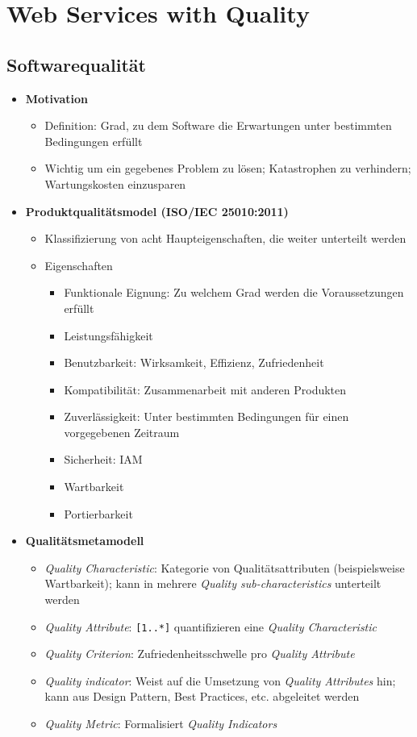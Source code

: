 \section{Web Services with Quality}

\subsection{Softwarequalität}
\begin{itemize}
	\item \textbf{Motivation}
	\begin{itemize}
		\item Definition: Grad, zu dem Software die Erwartungen unter bestimmten Bedingungen erfüllt
		\item Wichtig um ein gegebenes Problem zu lösen; Katastrophen zu verhindern; Wartungskosten einzusparen
	\end{itemize}
	\item \textbf{Produktqualitätsmodel (ISO/IEC 25010:2011)}
	\begin{itemize}
		\item Klassifizierung von acht Haupteigenschaften, die weiter unterteilt werden
		\item Eigenschaften
		\begin{itemize}
			\item Funktionale Eignung: Zu welchem Grad werden die Voraussetzungen erfüllt
			\item Leistungsfähigkeit
			\item Benutzbarkeit: Wirksamkeit, Effizienz, Zufriedenheit
			\item Kompatibilität: Zusammenarbeit mit anderen Produkten
			\item Zuverlässigkeit: Unter bestimmten Bedingungen für einen vorgegebenen Zeitraum
			\item Sicherheit: IAM
			\item Wartbarkeit
			\item Portierbarkeit
		\end{itemize}
	\end{itemize}
	\item \textbf{Qualitätsmetamodell}
	\begin{itemize}
		\item \textit{Quality Characteristic}: Kategorie von Qualitätsattributen (beispielsweise Wartbarkeit); kann in mehrere \textit{Quality sub-characteristics} unterteilt werden
		\item \textit{Quality Attribute}: \texttt{[1..*]} quantifizieren eine \textit{Quality Characteristic}
		\item \textit{Quality Criterion}: Zufriedenheitsschwelle pro \textit{Quality Attribute}
		\item \textit{Quality indicator}: Weist auf die Umsetzung von \textit{Quality Attributes} hin; kann aus Design Pattern, Best Practices, etc. abgeleitet werden
		\item \textit{Quality Metric}: Formalisiert \textit{Quality Indicators}
	\end{itemize}
\end{itemize}


